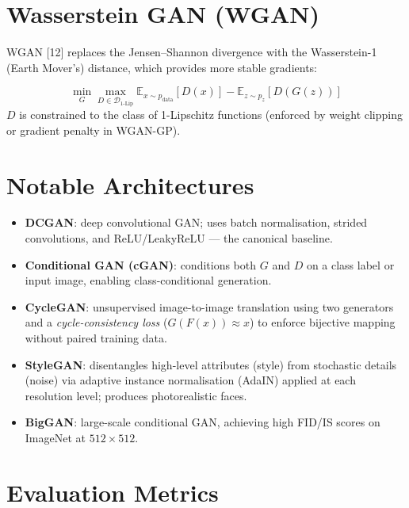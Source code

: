 \documentclass[12pt,a4paper]{report}
\begin{document}
\section{Wasserstein GAN (WGAN)}

WGAN [12] replaces the Jensen--Shannon divergence with the
Wasserstein-1 (Earth Mover's) distance, which provides more stable gradients:

\begin{formulabox}
\[
    \min_G \max_{D \in \mathcal{D}_{1\text{-Lip}}}
    \mathbb{E}_{x\sim p_{\text{data}}}[D(x)]
    - \mathbb{E}_{z\sim p_z}[D(G(z))]
\]
$D$ is constrained to the class of 1-Lipschitz functions (enforced by weight
clipping or gradient penalty in WGAN-GP).
\end{formulabox}

\section{Notable Architectures}

\begin{itemize}[itemsep=2pt]
    \item \textbf{DCGAN}: deep convolutional GAN; uses batch normalisation,
          strided convolutions, and ReLU/LeakyReLU — the canonical baseline.
    \item \textbf{Conditional GAN (cGAN)}: conditions both $G$ and $D$ on a
          class label or input image, enabling class-conditional generation.
    \item \textbf{CycleGAN}: unsupervised image-to-image translation using
          two generators and a \emph{cycle-consistency loss}
          ($G(F(x)) \approx x$) to enforce bijective mapping without paired
          training data.
    \item \textbf{StyleGAN}: disentangles high-level attributes (style) from
          stochastic details (noise) via adaptive instance normalisation (AdaIN)
          applied at each resolution level; produces photorealistic faces.
    \item \textbf{BigGAN}: large-scale conditional GAN, achieving high
          FID/IS scores on ImageNet at $512\times512$.
\end{itemize}

\section{Evaluation Metrics}
\end{document}

